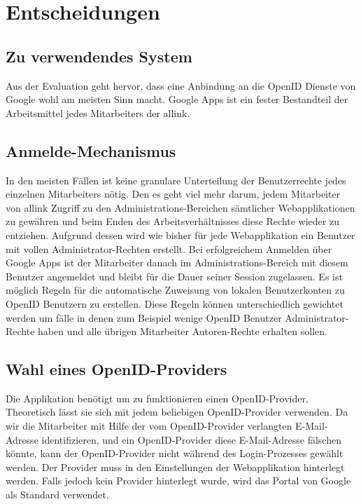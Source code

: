 \section{Entscheidungen}
\label{sec:Entscheidungen}

\subsection{Zu verwendendes System}
\label{sub:Zu verwendendes System}
Aus der Evaluation geht hervor, dass eine Anbindung an die OpenID Dienste von Google wohl am meisten Sinn macht. Google Apps ist ein fester Bestandteil der Arbeitsmittel jedes Mitarbeiters der allink.

\subsection{Anmelde-Mechanismus}
\label{sub:Anmelde-Mechanismus}
In den meisten Fällen ist keine granulare Unterteilung der Benutzerrechte jedes einzelnen Mitarbeiters nötig. Den es geht viel mehr darum, jedem Mitarbeiter von allink Zugriff zu den Administrations-Bereichen sämtlicher Webapplikationen zu gewähren und beim Enden des Arbeitsverhältnisses diese Rechte wieder zu entziehen. Aufgrund dessen wird wie bisher für jede Webapplikation ein Benutzer mit vollen Administrator-Rechten erstellt. Bei erfolgreichem Anmelden über Google Apps ist der Mitarbeiter danach im Administrations-Bereich mit diesem Benutzer angemeldet und bleibt für die Dauer seiner Session zugelassen.
Es ist möglich Regeln für die automatische Zuweisung von lokalen Benutzerkonten zu OpenID Benutzern zu erstellen. Diese Regeln können unterschiedlich gewichtet werden um fälle in denen zum Beispiel wenige OpenID Benutzer Administrator-Rechte haben und alle übrigen Mitarbeiter Autoren-Rechte erhalten sollen.

\subsection{Wahl eines OpenID-Providers}
\label{sub:Wahl eines OpenID Providers}
Die Applikation benötigt um zu funktionieren einen OpenID-Provider. Theoretisch lässt sie sich mit jedem beliebigen OpenID-Provider verwenden. Da wir die Mitarbeiter mit Hilfe der vom OpenID-Provider verlangten E-Mail-Adresse identifizieren, und ein OpenID-Provider diese E-Mail-Adresse fälschen könnte, kann der OpenID-Provider nicht während des Login-Prozesses gewählt werden. Der Provider muss in den Einstellungen der Webapplikation hinterlegt werden. Falls jedoch kein Provider hinterlegt wurde, wird das Portal von Google als Standard verwendet.

